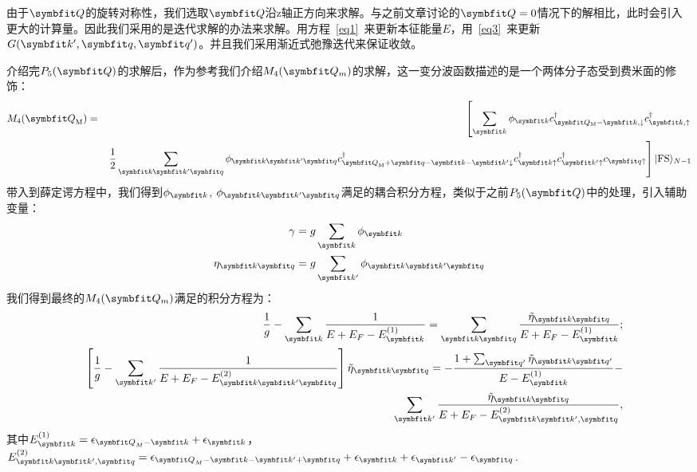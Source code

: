 由于$\Vector{Q}$的旋转对称性，我们选取$\Vector{Q}$沿z轴正方向来求解。与之前文章讨论的$\Vector{Q}=0$情况下的解相比，此时会引入更大的计算量。因此我们采用的是迭代求解的办法来求解。用方程~\ref{eq1}~来更新本征能量$E$，用~\ref{eq3}~来更新${G}(\Vector{k}',\Vector{q},\Vector{q}')$。并且我们采用渐近式弛豫迭代来保证收敛。

介绍完$P_5(\Vector{Q})$的求解后，作为参考我们介绍$M_4(\Vector{Q}_m)$的求解，这一变分波函数描述的是一个两体分子态受到费米面的修饰：
\begin{eqnarray}
M_{4}({\Vector{Q}}_{\rm M})&=&\left[\sum_{{\Vector{k} }}\phi_{{\Vector{k} }} c^{\dag}_{{\Vector{Q}_{\rm M}}-{\Vector{k}},\downarrow}c^{\dag}_{\Vector{k},\uparrow} \right.  \\
&&\left.  \frac{1}{2} \sum_{{\Vector{k} }{\Vector{k'} } {\Vector{q} }}\phi_{{\Vector{k} }{\Vector{k'} }  {\Vector{q} } } c^{\dag}_{{\Vector{Q} }_{\rm M}+{\Vector{q} }-{\Vector{k} }-{\Vector{k'} } \downarrow} c^{\dag}_{{\Vector{k} }\uparrow}c^{\dag}_{{\Vector{k'} }\uparrow}c_{{\Vector{q} } \uparrow}\right] |{\rm FS}\rangle_{N-1}\\ \label{wf_m}
\end{eqnarray}
带入到薛定谔方程中，我们得到$\phi_{{\Vector{k} }}$, $\phi_{{\Vector{k} }{\Vector{k'} }  {\Vector{q} } }$满足的耦合积分方程，类似于之前$P_5(\Vector{Q})$中的处理，引入辅助变量：
\begin{equation}
\begin{split}
\gamma&=g\sum_{\Vector{k} } \phi_{\Vector{k} }\\
\eta_{{\Vector{k} }{\Vector{q} }}&=g\sum_{\Vector{k'} }\phi_{{\Vector{k} }{\Vector{k'} }{\Vector{q} }}\\
\end{split}
\end{equation}
我们得到最终的$M_4(\Vector{Q}_m)$满足的积分方程为：
\begin{eqnarray}
&&\frac{1}{g}-\sum_{\Vector{k} }\frac{1}{E+E_F-E^{(1)}_{{\Vector{k} }}}=\sum_{{\Vector{k} }{\Vector{q} }}  \frac{ \tilde{\eta}_{\Vector{k}\Vector{q}} }{ E+E_F-E^{(1)}_{\Vector{k}}} ;\\
&&\left[\frac{1}{g}-\sum_{\Vector{k'} }\frac{1}{E+E_F-E^{(2)}_{{\Vector{k} }{\Vector{k'} }{\Vector{q} }}}\right]\tilde{\eta}_{\Vector{k}\Vector{q}} = -\frac{1+\sum_{\Vector{q'} }\tilde{\eta}_{\Vector{k}\Vector{q'}} }{E-E^{(1)}_{\Vector{k} }}- \nonumber\\
&& \ \ \ \ \ \ \ \ \ \ \ \ \ \ \ \ \ \ \ \ \ \ \ \ \ \ \ \ \ \sum_{\Vector{k}'} \frac{ \tilde{\eta}_{\Vector{k}\Vector{q}} }{ E+E_F-E^{(2)}_{\Vector{k}\Vector{k}',\Vector{q}}},
\end{eqnarray}
其中$E^{(1)}_{\Vector{k} }=\epsilon_{{\Vector{Q} }_M-{\Vector{k} }}+\epsilon_{{\Vector{k} }}$，$E^{(2)}_{\Vector{k}\Vector{k}',\Vector{q}}=\epsilon_{{\Vector{Q} }_M-{\Vector{k} }-{\Vector{k'} }+{\Vector{q} }}+\epsilon_{{\Vector{k} }}+\epsilon_{{\Vector{k} }'}-\epsilon_{{\Vector{q} }}$.

